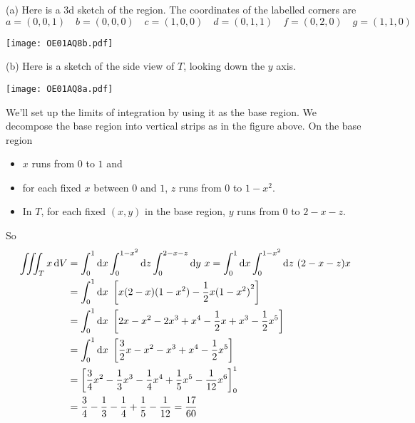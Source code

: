 \begin{solution}
(a)
Here is a 3d sketch of the region. The coordinates of the labelled corners are
\begin{equation*}
a=(0,0,1)\quad
b=(0,0,0)\quad
c=(1,0,0)\quad
d=(0,1,1)\quad
f=(0,2,0)\quad
g=(1,1,0)
\end{equation*}
\begin{center}
     \texttt{[image: OE01AQ8b.pdf]}
\end{center}

(b) Here is a sketch of the side view of $T$, looking down the $y$ axis. 
\begin{center}
     \texttt{[image: OE01AQ8a.pdf]}
\end{center}
We'll set up the limits of integration by using it as the base region.
We decompose the base region into vertical strips as in the figure above.
On the base region
\begin{itemize}
\item
$x$ runs from $0$ to $1$ and
\item 
for each fixed $x$ between $0$ and $1$, $z$ runs from $0$ to $1-x^2$.
\item
In $T$, for each fixed $(x,y)$ in the base region, $y$ runs from $0$ to
$2-x-z$.
\end{itemize}
So
\begin{align*}
\iiint_T x\,\mathrm{d}V
&=\int_0^1\mathrm{d}x\int_0^{1-x^2}\mathrm{d}z\int_0^{2-x-z}\mathrm{d}y\ x
=\int_0^1\mathrm{d}x\int_0^{1-x^2}\mathrm{d}z\ (2-x-z)x\cr
&=\int_0^1 \mathrm{d}x\ \left[x(2-x)(1-x^2)-\frac{1}{2} x{(1-x^2)}^2\right] \\
&=\int_0^1 \mathrm{d}x\ \left[2x-x^2-2x^3+x^4-\frac{1}{2} x+x^3
             -\frac{1}{2} x^5\right] \\
&=\int_0^1 \mathrm{d}x\ \left[\frac{3}{2}x-x^2-x^3+x^4-\frac{1}{2} x^5\right] \\
&=\left[\frac{3}{4}x^2-\frac{1}{3}x^3-\frac{1}{4}x^4+\frac{1}{5}x^5 -\frac{1}{12}x^6\right]_0^1 \\
&=\frac{3}{4}-\frac{1}{3}-\frac{1}{4}+\frac{1}{5}-\frac{1}{12}
=\frac{17}{60}
\end{align*}
\end{solution}



